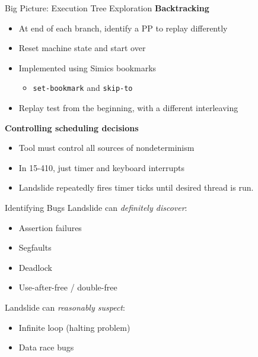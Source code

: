 \documentclass[xcolor=dvipsnames]{beamer}
\begin{document}
\begin{frame}{Big Picture: Execution Tree Exploration}
	\textbf{Backtracking}
	\begin{itemize}
		\item At end of each branch, identify a PP to replay differently
		\item Reset machine state and start over
		\item Implemented using Simics bookmarks
			\begin{itemize}
				\item {\tt set-bookmark} and {\tt skip-to}
			\end{itemize}
		\item Replay test from the beginning, with a different interleaving
	\end{itemize}
	\pause
	\linegap

	{\bf Controlling scheduling decisions}
	\begin{itemize}
		\item Tool must control all sources of nondeterminism
		\item In 15-410, just timer and keyboard interrupts
		\item Landslide repeatedly fires timer ticks until desired thread is run.
	\end{itemize}
\end{frame}


\begin{frame}{Identifying Bugs}
	Landslide can {\em definitely discover}:
	\begin{itemize}
		\item Assertion failures %
		\item Segfaults
		\item Deadlock
		\item Use-after-free / double-free
	\end{itemize}
	\linegap
	Landslide can {\em reasonably suspect}:
	\begin{itemize}
		\item Infinite loop (halting problem)
		\item Data race bugs
	\end{itemize}
\end{frame}
\end{document}
